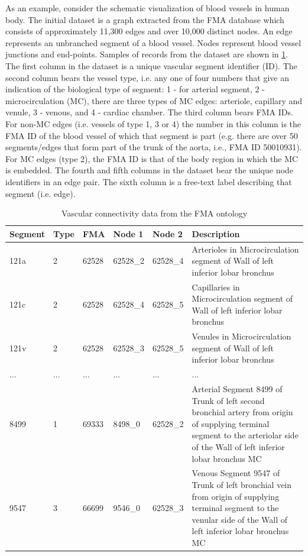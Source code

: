 As an example, consider the schematic visualization of blood vessels in human body.
The initial dataset is a graph extracted from the FMA database which consists of approximately 11,300 edges and over 10,000 distinct nodes.
An edge represents an unbranched segment of a blood vessel. Nodes represent blood vessel junctions and end-points.
Samples of records from the dataset are shown in \cref{tab:vascular-connectivity}. The first column in the dataset is a unique vascular segment identifier (ID). The second column bears the vessel type, i.e. any one of four numbers that give  an indication of the biological type of segment:
1 - for arterial segment, 2 - microcirculation (MC), there are three types of MC edges: arteriole, capillary and venule, 3 - venous, and 4 - cardiac chamber.
The third column bears FMA IDs. For non-MC edges (i.e. vessels of type 1, 3 or 4) the number in this column is the FMA ID of the blood vessel of
which that segment is part (e.g. there are over 50 segments/edges that form part of the trunk of the aorta, i.e., FMA ID 50010931). For MC edges (type 2), the FMA ID is that of the body region in which the MC is embedded. The fourth and fifth columns in the dataset bear the unique node identifiers in an edge pair.
The sixth column is a free-text label describing that segment (i.e. edge).

\begin{table}
\caption{Vascular connectivity data from the FMA ontology}
\begin{tabular}{|l|l|l|l|l|p{7cm}|}
  \hline
  Segment & Type & FMA & Node 1 & Node 2 & Description \\
  \hline
  121a & 2 & 62528 & 62528\_2 & 62528\_4 & Arterioles in Microcirculation segment of Wall of left inferior lobar bronchus \\
  121c & 2 & 62528 & 62528\_4 & 62528\_5 & Capillaries in Microcirculation segment of Wall of left inferior lobar bronchus\\
  121v & 2 & 62528 & 62528\_3 & 62528\_5 & Venules in Microcirculation segment of Wall of left inferior lobar bronchus\\
  ... &... & ...   & ...      & ...      & ...\\
  8499 & 1 & 69333 & 8498\_0 & 62528\_2  & Arterial Segment 8499 of Trunk
of left second bronchial artery from origin of supplying terminal segment
to the arteriolar side of the Wall of left inferior lobar bronchus
MC\\
  9547 & 3 & 66699 & 9546\_0 & 62528\_3 & Venous Segment 9547 of Trunk of
left bronchial vein from origin of supplying terminal segment to the
venular side of the Wall of left inferior lobar bronchus MC \\
  \hline
\end{tabular}
\label{tab:vascular-connectivity}
\end{table}

